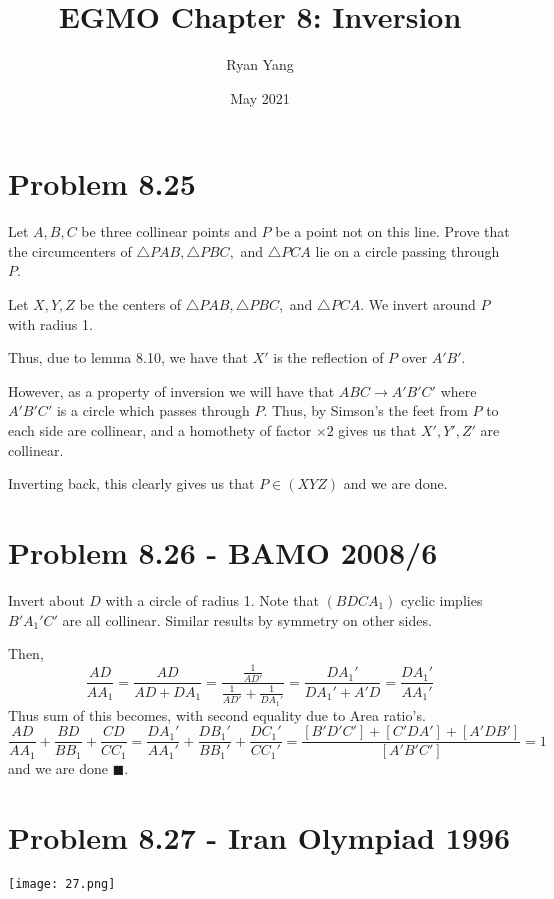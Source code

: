 \documentclass[11pt]{scrartcl}
\title{EGMO Chapter 8: Inversion}
\author{Ryan Yang}
\date{May 2021}
\begin{document}
\maketitle

\section{Problem 8.25}
\begin{problem}
Let $A,B,C$ be three collinear points and $P$ be a point not on this line. Prove that the circumcenters of $\triangle PAB, \triangle PBC,$ and $\triangle PCA$ lie on a circle passing through $P$. 
\end{problem}
\begin{soln}
Let $X,Y,Z$ be the centers of $\triangle PAB, \triangle PBC,$ and $\triangle PCA$.  We invert around $P$ with radius 1. 

Thus, due to lemma 8.10, we have that $X'$ is the reflection of $P$ over $A'B'$.

However, as a property of inversion we will have that $ABC\to A'B'C'$ where $A'B'C'$ is a circle which passes through $P$. Thus, by Simson's the feet from $P$ to each side are collinear, and a homothety of factor $\times 2$ gives us that $X',Y',Z'$ are collinear.

Inverting back, this clearly gives us that $P\in (XYZ)$ and we are done.
\end{soln}

\section{Problem 8.26 - BAMO 2008/6}

Invert about $D$ with a circle of radius 1. Note that $(BDCA_1)$ cyclic implies $B'A_1'C'$ are all collinear. Similar results by symmetry on other sides.

Then, 
\[\frac{AD}{AA_1} = \frac{AD}{AD+DA_1}=\frac{\frac{1}{AD'}}{\frac{1}{AD'}+\frac{1}{DA_1'}}=\frac{DA_1'}{DA_1'+A'D} = \frac{DA_1'}{AA_1'}\]
Thus sum of this becomes, with second equality due to Area ratio's.
\[\frac{AD}{AA_1}+\frac{BD}{BB_1}+\frac{CD}{CC_1} = \frac{DA_1'}{AA_1'}+\frac{DB_1'}{BB_1'}+\frac{DC_1'}{CC_1'} = \frac{[B'D'C']+[C'DA']+[A'DB']}{[A'B'C']}=1\]
and we are done $\blacksquare$.

\section{Problem 8.27 - Iran Olympiad 1996}
\texttt{[image: 27.png]}
\end{document}
